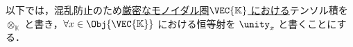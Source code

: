 \documentclass[TQFT_main]{subfiles}
\begin{document}
\begin{marker}
    以下では，混乱防止のため\hyperref[redef:monoidal-category]{厳密なモノイダル圏}\underline{$\VEC{\mathbb{K}}$ における}テンソル積を $\otimes_{\mathbb{K}}$ と書き，$\forall x \in \Obj{\VEC{\mathbb{K}}}$ における恒等射を $\unity_x$ と書くことにする．
\end{marker}


\end{document}
